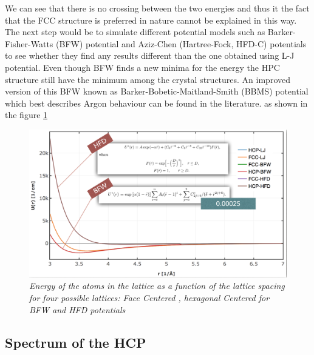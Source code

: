 \documentclass[a4paper]{article}
\begin{document}
We can see that there is no crossing between the two energies and thus it the fact that the FCC structure is preferred in nature cannot be explained in this way.
The next step would be to simulate different potential models such as Barker-Fisher-Watts (BFW) potential and Aziz-Chen (Hartree-Fock, HFD-C) potentials to see whether they find any results different than the one obtained using L-J potential. Even though BFW finds a new minima for the energy the HPC structure still have the minimum among
 the crystal structures. An improved version of this BFW known as Barker-Bobetic-Maitland-Smith (BBMS) potential  which best describes Argon behaviour can be found in the literature. as shown in the figure \ref{diff-pot}
 \begin{figure}[h]\label{diff-pot}
    \centering
    \includegraphics[width=12cm]{diff_pot.png}
    \caption{\it \label{diff-pot}Energy of the atoms in the lattice as a function of the lattice spacing for four possible lattices: Face Centered , hexagonal Centered for BFW and HFD potentials }
\end{figure}
\subsection{Spectrum of the HCP}
\end{document}

